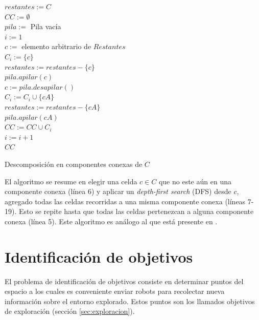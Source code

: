 \begin{algorithm}[H]
\SetAlgoLined
  $restantes := C$ \\
  $CC := \emptyset$ \\
  $pila :=$ Pila vacía \\
  $i := 1$ \\
   {
    $c :=$ elemento arbitrario de $Restantes$ \\


    $C_i :=  \{c\}$ \\
    $restantes := restantes - \{c\}$ \\
    $pila.apilar(c)$ \\
     {
      $c := pila.desapilar()$ \\
       {
         {
          $C_i :=  C_i \cup \{cA\}$ \\
          $restantes := restantes - \{cA\}$ \\
          $pila.apilar(cA)$ \\
        }
      }
    }
    $CC := CC \cup C_i$ \\
    $i := i + 1$ \\
  }
  \Return $CC$ 

  \caption{Descomposición en componentes conexas de $C$}
  \label{alg:compcon}
\end{algorithm}

El algoritmo se resume en elegir una celda $c\in C$ que no este aún en una
componente conexa (línea 6) y aplicar un \emph{depth-first search} (DFS) desde
$c$, agregado todas las celdas recorridas a una misma componente conexa (líneas
7-19). Esto se repite hasta que todas las celdas pertenezcan a alguna
componente conexa (línea 5). Este algoritmo es análogo al que está presente en
\cite{hopcroft1973algorithm}.

\section{Identificación de objetivos}\label{sec:pc:idobj}
El problema de identificación de objetivos consiste en determinar puntos
del espacio a los cuales es conveniente enviar robots para recolectar nueva
información sobre el entorno explorado. Estos puntos son los llamados objetivos
de exploración (sección \ref{sec:exploracion}). 

